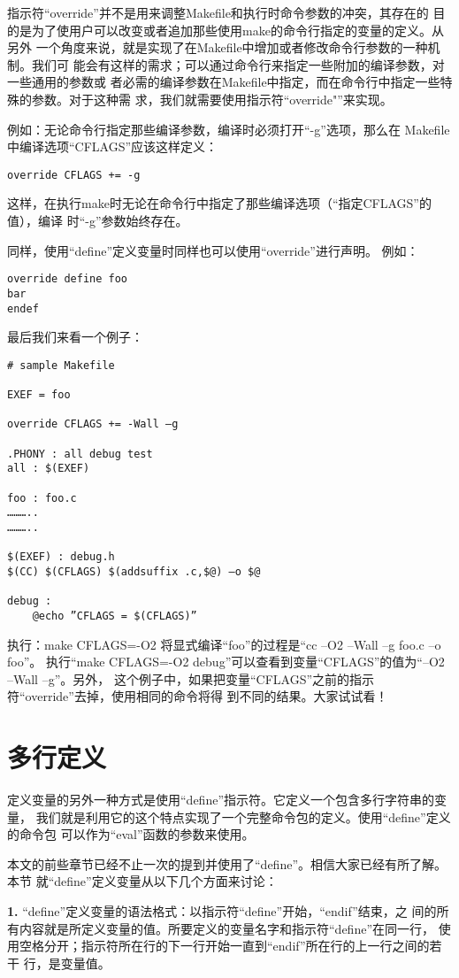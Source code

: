 指示符“override”并不是用来调整Makefile和执行时命令参数的冲突，其存在的
目的是为了使用户可以改变或者追加那些使用make的命令行指定的变量的定义。从另外
一个角度来说，就是实现了在Makefile中增加或者修改命令行参数的一种机制。我们可
能会有这样的需求；可以通过命令行来指定一些附加的编译参数，对一些通用的参数或
者必需的编译参数在Makefile中指定，而在命令行中指定一些特殊的参数。对于这种需
求，我们就需要使用指示符“override"”来实现。

例如：无论命令行指定那些编译参数，编译时必须打开“-g”选项，那么在
Makefile中编译选项“CFLAGS”应该这样定义：
\begin{Verbatim}[]
override CFLAGS += -g
\end{Verbatim}
这样，在执行make时无论在命令行中指定了那些编译选项（“指定CFLAGS”的值），编译
时“-g”参数始终存在。


同样，使用“define”定义变量时同样也可以使用“override”进行声明。
例如：
\begin{Verbatim}[]
override define foo
bar
endef
\end{Verbatim}
最后我们来看一个例子：
\begin{Verbatim}[]
# sample Makefile

EXEF = foo

override CFLAGS += -Wall –g

.PHONY : all debug test
all : $(EXEF)

foo : foo.c
………..
………..

$(EXEF) : debug.h
$(CC) $(CFLAGS) $(addsuffix .c,$@) –o $@

debug :
    @echo ”CFLAGS = $(CFLAGS)”
\end{Verbatim}

执行：make CFLAGS=-O2 将显式编译“foo”的过程是“cc –O2 –Wall –g foo.c –o foo”。
执行“make CFLAGS=-O2 debug”可以查看到变量“CFLAGS”的值为“–O2 –Wall –g”。另外，
这个例子中，如果把变量“CFLAGS”之前的指示符“override”去掉，使用相同的命令将得
到不同的结果。大家试试看！


\section{多行定义}
定义变量的另外一种方式是使用“define”指示符。它定义一个包含多行字符串的变量，
我们就是利用它的这个特点实现了一个完整命令包的定义。使用“define”定义的命令包
可以作为“eval”函数的参数来使用。

本文的前些章节已经不止一次的提到并使用了“define”。相信大家已经有所了解。本节
就“define”定义变量从以下几个方面来讨论：

\textbf{1.} “define”定义变量的语法格式：以指示符“define”开始，“endif”结束，之
间的所有内容就是所定义变量的值。所要定义的变量名字和指示符“define”在同一行，
使用空格分开；指示符所在行的下一行开始一直到“endif”所在行的上一行之间的若干
行，是变量值。

